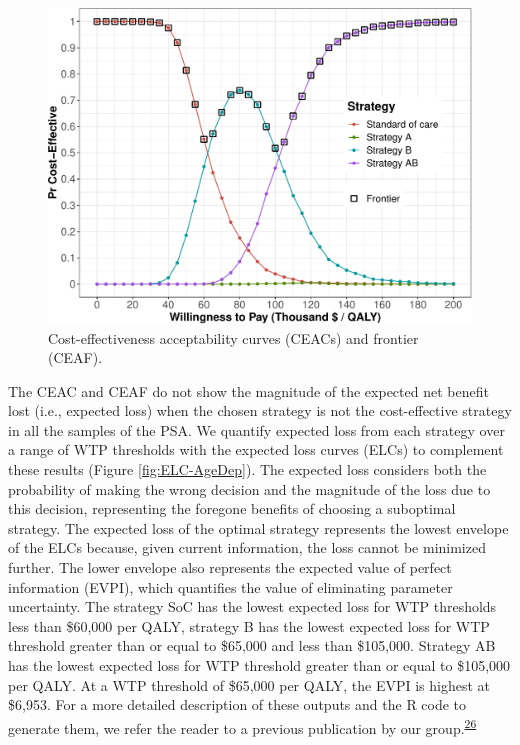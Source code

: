 \documentclass[
]{article}
\begin{document}
\begin{figure}[H]

{\centering \includegraphics{figs/CEAC-AgeDep-1} 

}

\caption{Cost-effectiveness acceptability curves (CEACs) and frontier (CEAF).}\label{fig:CEAC-AgeDep}
\end{figure}

The CEAC and CEAF do not show the magnitude of the expected net benefit lost (i.e., expected loss) when the chosen strategy is not the cost-effective strategy in all the samples of the PSA. We quantify expected loss from each strategy over a range of WTP thresholds with the expected loss curves (ELCs) to complement these results (Figure \ref{fig:ELC-AgeDep}). The expected loss considers both the probability of making the wrong decision and the magnitude of the loss due to this decision, representing the foregone benefits of choosing a suboptimal strategy. The expected loss of the optimal strategy represents the lowest envelope of the ELCs because, given current information, the loss cannot be minimized further. The lower envelope also represents the expected value of perfect information (EVPI), which quantifies the value of eliminating parameter uncertainty. The strategy SoC has the lowest expected loss for WTP thresholds less than \$60,000 per QALY, strategy B has the lowest expected loss for WTP threshold greater than or equal to \$65,000 and less than \$105,000. Strategy AB has the lowest expected loss for WTP threshold greater than or equal to \$105,000 per QALY. At a WTP threshold of \$65,000 per QALY, the EVPI is highest at \$6,953. For a more detailed description of these outputs and the R code to generate them, we refer the reader to a previous publication by our group.\textsuperscript{\protect\hyperlink{ref-Alarid-Escudero2019}{26}}
\end{document}
